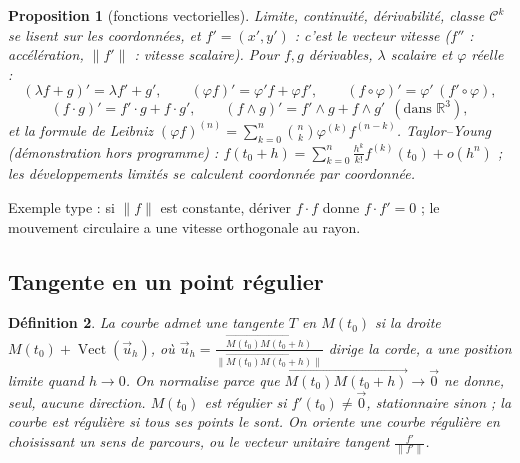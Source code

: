 \documentclass[a4paper,11pt]{article}
\numberwithin{equation}{section}
\numberwithin{figure}{section}
\numberwithin{table}{section}
\theoremstyle{enonce}
\newtheorem{definition}{Définition}[section]
\newtheorem{proposition}[definition]{Proposition}
\theoremstyle{exemple}
\theoremstyle{remarque}
\newcommand{\R}{\mathbb{R}}
\newcommand{\vect}{\operatorname{Vect}}
\newcommand{\vv}[1]{\overrightarrow{#1}}
\newcommand{\ve}[1]{\vec{#1}}
\begin{document}
\begin{proposition}[fonctions vectorielles]\label{prop:fv}
Limite, continuité, dérivabilité, classe $\mathcal C^k$ se lisent \emph{sur les coordonnées}, et $f'=(x',y')$ : c'est le
vecteur vitesse ($f''$ : accélération, $\|f'\|$ : vitesse scalaire). Pour $f,g$ dérivables, $\lambda$ scalaire et $\varphi$
réelle :
\[(\lambda f+g)'=\lambda f'+g',\qquad(\varphi f)'=\varphi'f+\varphi f',\qquad(f\circ\varphi)'=\varphi'\,(f'\circ\varphi),\]
\[(f\cdot g)'=f'\cdot g+f\cdot g',\qquad(f\wedge g)'=f'\wedge g+f\wedge g'\ \ (\text{dans }\R^3),\]
et la formule de Leibniz $(\varphi f)^{(n)}=\sum_{k=0}^n\binom nk\varphi^{(k)}f^{(n-k)}$. Taylor--Young (démonstration hors
programme) : $f(t_0+h)=\sum_{k=0}^n\frac{h^k}{k!}f^{(k)}(t_0)+o(h^n)$ ; les développements limités se calculent coordonnée par
coordonnée.
\end{proposition}
Exemple type : si $\|f\|$ est constante, dériver $f\cdot f$ donne $f\cdot f'=0$ ; le mouvement circulaire a une vitesse
orthogonale au rayon.


\subsection{Tangente en un point régulier}

\begin{definition}
La courbe admet une tangente $T$ en $M(t_0)$ si la droite $M(t_0)+\vect(\ve u_h)$, où
$\ve u_h=\frac{\vv{M(t_0)M(t_0+h)}}{\|\vv{M(t_0)M(t_0+h)}\|}$ dirige la corde, a une position limite quand $h\to0$. On
normalise parce que $\vv{M(t_0)M(t_0+h)}\to\ve0$ ne donne, seul, aucune direction. $M(t_0)$ est \emph{régulier} si
$f'(t_0)\neq\ve0$, \emph{stationnaire} sinon ; la courbe est \emph{régulière} si tous ses points le sont. On \emph{oriente} une
courbe régulière en choisissant un sens de parcours, ou le vecteur unitaire tangent $\frac{f'}{\|f'\|}$.
\end{definition}
\end{document}
